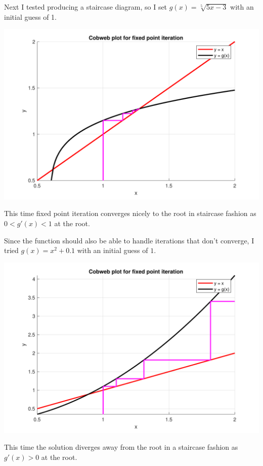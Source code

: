 \documentclass[a4paper,11pt]{article}
\begin{document}
\begin{enumerate}
	Next I tested producing a staircase diagram, so I set $g(x) = 
	\sqrt[5]{5x-3}$ with an initial guess of 1.
	
	\begin{center}
		\includegraphics[scale=0.6]{images/Q1d_staircase.pdf}
	\end{center}
	This time fixed point iteration converges nicely to the root in staircase 
	fashion as $0<g'(x)<1$ at the root.

	Since the function should also be able to handle iterations that don't 
	converge, I tried $g(x)=x^{2} + 0.1$ with an initial guess of 
	$1$.
	
	\begin{center}
		\includegraphics[scale=0.6]{images/Q1d_divergance.pdf}
	\end{center}
	This time the solution diverges away from the root in a staircase fashion 
	as $g'(x)>0$ at the root.
	

\end{enumerate}
\end{document}
